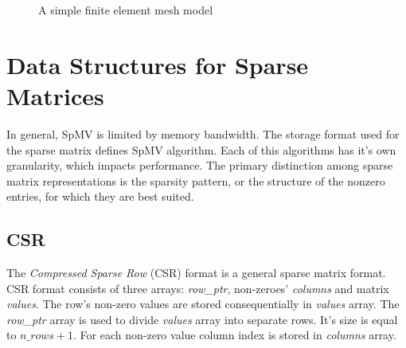 \documentclass{article}
\begin{document}
\begin{figure}
{
  }
  \caption{A simple finite element mesh model}
  \label{fem_to_sparse_matrix}
\end{figure}

\section{Data Structures for Sparse Matrices}
In general, SpMV is limited by memory bandwidth. The storage format used for the sparse matrix defines SpMV algorithm. Each of this
algorithms has it's own granularity, which impacts performance. The primary distinction among sparse matrix representations is the 
sparsity pattern, or the structure of the nonzero entries, for which they are best suited. 

\subsection{CSR}

The \textit{Compressed Sparse Row} (CSR) format is a general sparse matrix format. CSR format consists of three arrays: \textit{row\_ptr},
non-zeroes' \textit{columns} and matrix \textit{values}. The row's non-zero values are stored consequentially in \textit{values} array. The \textit{row\_ptr} array
is used to divide \textit{values} array into separate rows. It's size is equal to $n\_rows + 1$. For each non-zero value column index is stored in 
\textit{columns} array.
\end{document}
